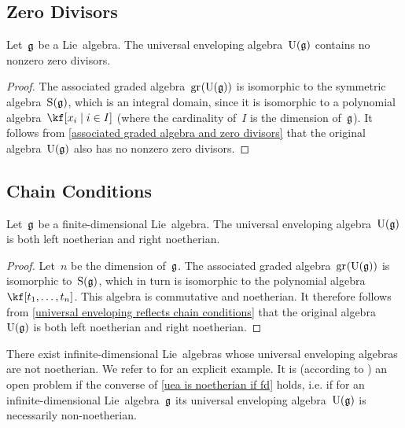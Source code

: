 \subsection{Zero Divisors}

\begin{proposition}
	\label{uea contains no zero divisors}
	Let~$\mathfrak{g}$ be a Lie~algebra.
	The universal enveloping algebra~$\operatorname{U}(\mathfrak{g})$ contains no nonzero zero divisors.
\end{proposition}


\begin{proof}
	The associated graded algebra~$\gr(\Univ(\glie))$ is isomorphic to the symmetric algebra~$\operatorname{S}(\mathfrak{g})$, which is an integral domain, since it is isomorphic to a polynomial algebra~$\kf[x_i \suchthat i \in I]$ (where the cardinality of~$I$ is the dimension of~$\mathfrak{g}$).
	It follows from \cref{associated graded algebra and zero divisors} that the original algebra~$\operatorname{U}(\mathfrak{g})$ also has no nonzero zero divisors.
\end{proof}



\subsection{Chain Conditions}

\begin{proposition}
	\label{uea is noetherian if fd}
	Let~$\mathfrak{g}$ be a finite-dimensional Lie~algebra.
	The universal enveloping algebra~$\operatorname{U}(\mathfrak{g})$ is both left noetherian and right noetherian.
\end{proposition}


\begin{proof}
	Let~$n$ be the dimension of~$\mathfrak{g}$.
	The associated graded algebra~$\gr(\Univ(\glie))$ is isomorphic to~$\operatorname{S}(\mathfrak{g})$, which in turn is isomorphic to the polynomial algebra~$\kf[t_1, \dotsc, t_n]$.
	This algebra is commutative and noetherian.
	It therefore follows from \cref{universal enveloping reflects chain conditions} that the original algebra~$\operatorname{U}(\mathfrak{g})$ is both left noetherian and right noetherian.
\end{proof}


\begin{remark}
	There exist infinite-dimensional Lie~algebras whose universal enveloping algebras are not noetherian.
	We refer to \cite{sierra_walten_uea_witt_not_noetherian} for an explicit example.
	It is (according to \cite[p.~xix]{goodearl_warfield_introduction_to_nn_rings}) an open problem if the converse of \cref{uea is noetherian if fd} holds, i.e. if for an infinite-dimensional Lie~algebra~$\mathfrak{g}$ its universal enveloping algebra~$\operatorname{U}(\mathfrak{g})$ is necessarily non-noetherian.
\end{remark}


